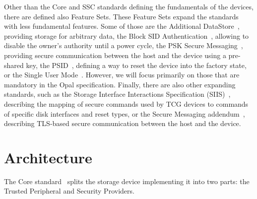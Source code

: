 Other than the Core and SSC standards defining the fundamentals of the devices, there are defined also Feature Sets. These Feature Sets expand the standards with less fundamental features. Some of those are 
the Additional DataStore~\cite{tcg-additional-datastore}, providing storage for arbitrary data,
the Block SID Authentication~\cite{tcg-block-sid-auth}, allowing to disable the owner's authority until a power cycle,
the PSK Secure Messaging~\cite{tcg-psk-secure-messaging}, providing secure communication between the host and the device using a pre-shared key,
the PSID~\cite{tcg-psid}, defining a way to reset the device into the factory state,
or the Single User Mode~\cite{tcg-sum}.
However, we will focus primarily on those that are mandatory in the Opal specification.
Finally, there are also other expanding standards, such as the Storage Interface Interactions Specification (SIIS)~\cite{tcg-siis}, describing the mapping of secure commands used by TCG devices to commands of specific disk interfaces and reset types, or the Secure Messaging addendum~\cite{tcg-secure-messaging-addendum}, describing TLS-based secure communication between the host and the device.

\section{Architecture}



    

The Core standard~\cite{tcg-storage-core} splits the storage device implementing it into two parts: the Trusted Peripheral and Security Providers.

